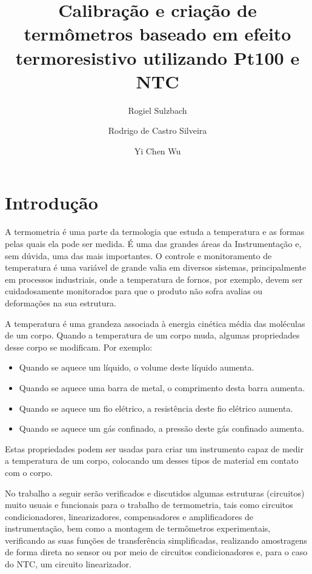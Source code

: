 \documentclass[a4paper]{instrumentacao}
\title{Calibração e criação de termômetros baseado em efeito termoresistivo utilizando Pt100 e NTC}
\author{Rogiel Sulzbach \and Rodrigo de Castro Silveira \and Yi Chen Wu}
\institute{Universidade Federal do Rio Grande do Sul, Departamento de Engenharia Elétrica, Curso de Engenharia Elétrica, Instrumentação A, Prof. Dr. Alexandre Balbinot}
\begin{document}
\fontsize{13pt}{15pt}\selectfont

\maketitle



\chapter{Introdução}
A termometria é uma parte da termologia que estuda a temperatura e as formas pelas quais ela pode ser medida. É uma das grandes áreas da Instrumentação e, sem dúvida, uma das mais importantes. O controle e monitoramento de temperatura é uma variável de grande valia em diversos sistemas, principalmente em processos industriais, onde a temperatura de fornos, por exemplo, devem ser cuidadosamente monitorados para que o produto não sofra avalias ou deformações na sua estrutura.

A temperatura é uma grandeza associada à energia cinética média das moléculas de um corpo. Quando a temperatura de um corpo muda, algumas propriedades desse corpo se modificam. Por exemplo:

\begin{itemize}
	\item Quando se aquece um líquido, o volume deste líquido aumenta.
	\item Quando se aquece uma barra de metal, o comprimento desta barra aumenta.
	\item Quando se aquece um fio elétrico, a resistência deste fio elétrico aumenta.
	\item Quando se aquece um gás confinado, a pressão deste gás confinado aumenta.
\end{itemize}

Estas propriedades podem ser usadas para criar um instrumento capaz de medir a temperatura de um corpo, colocando um desses tipos de material em contato com o corpo.

No trabalho a seguir serão verificados e discutidos algumas estruturas (circuitos) muito usuais e funcionais para o trabalho de termometria, tais como circuitos condicionadores, linearizadores, compensadores e amplificadores de instrumentação, bem como a montagem de termômetros experimentais, verificando as suas funções de transferência simplificadas, realizando amostragens de forma direta no sensor ou por meio de circuitos condicionadores e, para o caso do NTC, um circuito linearizador.
\end{document}
